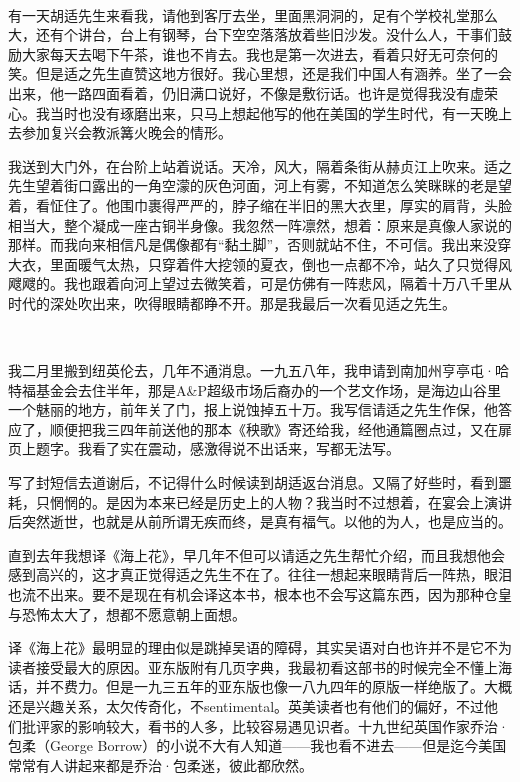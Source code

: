 \par  
\par 有一天胡适先生来看我，请他到客厅去坐，里面黑洞洞的，足有个学校礼堂那么大，还有个讲台，台上有钢琴，台下空空落落放着些旧沙发。没什么人，干事们鼓励大家每天去喝下午茶，谁也不肯去。我也是第一次进去，看着只好无可奈何的笑。但是适之先生直赞这地方很好。我心里想，还是我们中国人有涵养。坐了一会出来，他一路四面看着，仍旧满口说好，不像是敷衍话。也许是觉得我没有虚荣心。我当时也没有琢磨出来，只马上想起他写的他在美国的学生时代，有一天晚上去参加复兴会教派篝火晚会的情形。
\par 我送到大门外，在台阶上站着说话。天冷，风大，隔着条街从赫贞江上吹来。适之先生望着街口露出的一角空濛的灰色河面，河上有雾，不知道怎么笑眯眯的老是望着，看怔住了。他围巾裹得严严的，脖子缩在半旧的黑大衣里，厚实的肩背，头脸相当大，整个凝成一座古铜半身像。我忽然一阵凛然，想着：原来是真像人家说的那样。而我向来相信凡是偶像都有“黏土脚”，否则就站不住，不可信。我出来没穿大衣，里面暖气太热，只穿着件大挖领的夏衣，倒也一点都不冷，站久了只觉得风飕飕的。我也跟着向河上望过去微笑着，可是仿佛有一阵悲风，隔着十万八千里从时代的深处吹出来，吹得眼睛都睁不开。那是我最后一次看见适之先生。
\par  
\par 我二月里搬到纽英伦去，几年不通消息。一九五八年，我申请到南加州亨亭屯·哈特福基金会去住半年，那是A\&P超级市场后裔办的一个艺文作场，是海边山谷里一个魅丽的地方，前年关了门，报上说蚀掉五十万。我写信请适之先生作保，他答应了，顺便把我三四年前送他的那本《秧歌》寄还给我，经他通篇圈点过，又在扉页上题字。我看了实在震动，感激得说不出话来，写都无法写。
\par 写了封短信去道谢后，不记得什么时候读到胡适返台消息。又隔了好些时，看到噩耗，只惘惘的。是因为本来已经是历史上的人物？我当时不过想着，在宴会上演讲后突然逝世，也就是从前所谓无疾而终，是真有福气。以他的为人，也是应当的。
\par 直到去年我想译《海上花》，早几年不但可以请适之先生帮忙介绍，而且我想他会感到高兴的，这才真正觉得适之先生不在了。往往一想起来眼睛背后一阵热，眼泪也流不出来。要不是现在有机会译这本书，根本也不会写这篇东西，因为那种仓皇与恐怖太大了，想都不愿意朝上面想。
\par 译《海上花》最明显的理由似是跳掉吴语的障碍，其实吴语对白也许并不是它不为读者接受最大的原因。亚东版附有几页字典，我最初看这部书的时候完全不懂上海话，并不费力。但是一九三五年的亚东版也像一八九四年的原版一样绝版了。大概还是兴趣关系，太欠传奇化，不sentimental。英美读者也有他们的偏好，不过他们批评家的影响较大，看书的人多，比较容易遇见识者。十九世纪英国作家乔治·包柔（George Borrow）的小说不大有人知道——我也看不进去——但是迄今美国常常有人讲起来都是乔治·包柔迷，彼此都欣然。
